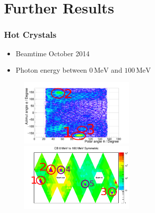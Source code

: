 \documentclass[slidestop,compress,mathserif]{beamer}
\begin{document}
\section{Further Results}
\begin{frame}
	\frametitle{Hot Crystals}
	\begin{itemize}
		\item Beamtime October 2014
		\item Photon energy between $0\,\text{MeV}$ and $100\,\text{MeV}$
	\end{itemize}
	\begin{figure}
		\includegraphics[width=0.50\textwidth]{Pictures/20172104StrahlzeitClusterSize0Marker}
		\includegraphics[width=0.50\textwidth]{Pictures/20172104StrahlzeitClusterSize0MarkerMap}
		
	\end{figure}
	\begin{table}
	
	\end{table}
\end{frame}
\end{document}
